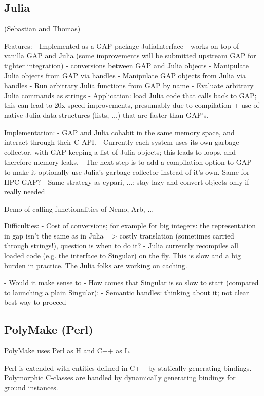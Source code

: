 \subsection{Julia}

(Sebastian and Thomas)

Features:
- Implemented as a GAP package JuliaInterface
- works on top of vanilla GAP and Julia (some improvements will be submitted upstream GAP for tighter integration)
- conversions between GAP and Julia objects
- Manipulate Julia objects from GAP via handles
- Manipulate GAP objects from Julia via handles
- Run arbitrary Julia functions from GAP by name
- Evaluate arbitrary Julia commands as strings
- Application: load Julia code that calls back to GAP; this can lead to 20x speed improvements,
  presumably due to compilation + use of native Julia data structures (lists, ...) that are faster
  than GAP's.

Implementation:
- GAP and Julia cohabit in the same memory space, and interact through their C-API.
- Currently each system uses its own garbage collector, with GAP keeping a list
  of Julia objects; this leads to loops, and therefore memory leaks.
- The next step is to add a compilation option to GAP to make it optionally use
  Julia's garbage collector instead of it's own. Same for HPC-GAP?
- Same strategy as cypari, ...: stay lazy and convert objects only if really needed

Demo of calling functionalities of Nemo, Arb, ...

Difficulties:
- Cost of conversions; for example for big integers: the representation in gap isn't the same as in Julia => costly translation (sometimes carried through strings!), question is when to do it?
- Julia currently recompiles all loaded code (e.g. the interface to Singular) on the fly. This is slow and a big
  burden in practice. The Julia folks are working on caching.

- Would it make sense to 
- How comes that Singular is so slow to start (compared to launching a plain Singular):
- Semantic handles: thinking about it; not clear best way to proceed

\subsection{PolyMake (Perl)}

PolyMake uses Perl as H and C++ as L.

Perl is extended with entities defined in C++ by statically generating bindings.
Polymorphic C-classes are handled by dynamically generating bindings for ground instances.


